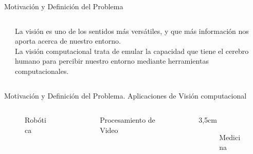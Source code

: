 \begin{frame}[t]{Motivaci\'on y Definici\'on del Problema}
\begin{columns}[t]
    \begin{column}[T]{5cm}
     \end{column}

     \begin{column}[T]{5cm} %
    La visi\'on es uno de los sentidos m\'as vers\'atiles, y que m\'as informaci\'on nos aporta acerca de nuestro entorno. \\
    La visi\'on computacional trata de emular la capacidad que tiene el cerebro humano para percibir nuestro entorno mediante herramientas computacionales.
     \end{column}
     \end{columns}


\end{frame}

\begin{frame}[t]{Motivaci\'on y Definici\'on del Problema. Aplicaciones de Visi\'on computacional}
\centering
\begin{columns}[t]
    \begin{column}[T]{2cm}
    \centering
    \begin{figure}
     \centering
          \caption*{Rob\'otica}
    \end{figure}
     \end{column}

     \begin{column}[T]{2cm} %
      \begin{figure}
       \centering
            \caption*{Procesamiento de Video}
      \end{figure}
     \end{column}

     \begin{column}[T]{3,5cm}
      \begin{figure}
       \centering
          \caption*{Medicina}
      \end{figure}
     \end{column}
     \end{columns}


\end{frame}
